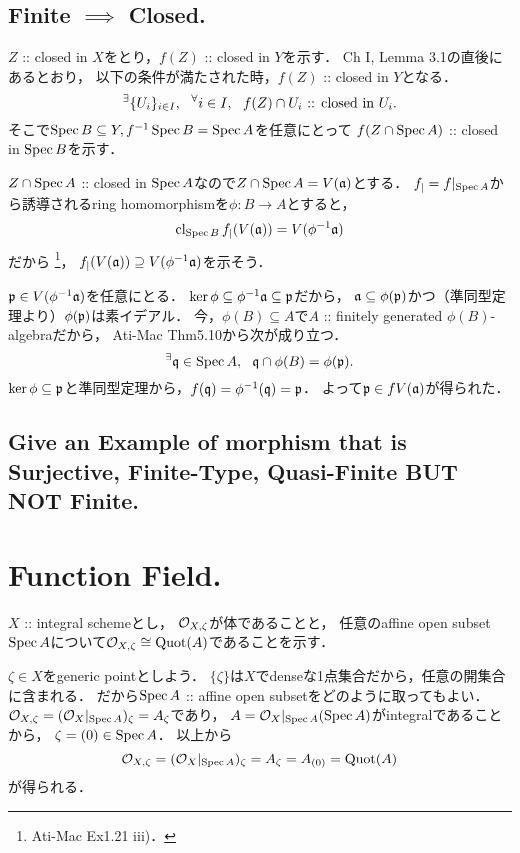 \documentclass[a4paper]{jsarticle}
\begin{document}
    \subsection{Finite $\implies$ Closed.}
    $Z$ :: closed in $X$をとり，$f(Z)$ :: closed in $Y$を示す．
    Ch I, Lemma 3.1の直後にあるとおり，
    以下の条件が満たされた時，$f(Z)$ :: closed in $Y$となる．
    \[ {}^{\exists} \{U_i\}_{i \in I},~~ {}^{\forall} i \in I,~~ f(Z) \cap U_i\text{ :: closed in }U_i. \]
    そこで$\operatorname{Spec} B \subseteq Y, f^{-1}\operatorname{Spec} B=\operatorname{Spec} A$を任意にとって
    $f(Z \cap \operatorname{Spec} A)$ :: closed in $\operatorname{Spec} B$を示す．

    $Z \cap \operatorname{Spec} A$ :: closed in $\operatorname{Spec} A$なので$Z \cap \operatorname{Spec} A=V(\mathfrak{a})$とする．
    $f_|=f|_{\operatorname{Spec} A}$から誘導されるring homomorphismを$\phi: B \to A$とすると，
    \[ \operatorname{cl}_{\operatorname{Spec} B}f_|(V(\mathfrak{a}))=V(\phi^{-1}\mathfrak{a}) \]だから
    \footnote{Ati-Mac Ex1.21 iii)．}，
    $f_|(V(\mathfrak{a})) \supseteq V(\phi^{-1}\mathfrak{a})$を示そう．
    
    $\mathfrak{p} \in V(\phi^{-1}\mathfrak{a})$を任意にとる．
    $\ker \phi \subseteq \phi^{-1}\mathfrak{a} \subseteq \mathfrak{p}$だから，
    $\mathfrak{a} \subseteq \phi(\mathfrak{p})$かつ（準同型定理より）$\phi(\mathfrak{p})$は素イデアル．
    今，$\phi(B) \subseteq A$で$A$ :: finitely generated $\phi(B)$-algebraだから，
    Ati-Mac Thm5.10から次が成り立つ．
    \[ {}^{\exists} \mathfrak{q} \in \operatorname{Spec} A,~~ \mathfrak{q} \cap \phi(B)=\phi(\mathfrak{p}). \]
    $\ker \phi \subseteq \mathfrak{p}$と準同型定理から，$f(\mathfrak{q})=\phi^{-1}(\mathfrak{q})=\mathfrak{p}$．
    よって$\mathfrak{p} \in fV(\mathfrak{a})$が得られた．

    \subsection{Give an Example of morphism that is Surjective, Finite-Type, Quasi-Finite BUT NOT Finite.}

\section{Function Field.} %
    $X$ :: integral schemeとし，
    $\mathcal{O}_{X, \zeta}$が体であることと，
    任意のaffine open subset $\operatorname{Spec} A$について$\mathcal{O}_{X, \zeta} \cong \operatorname{Quot}(A)$であることを示す．

    $\zeta \in X$をgeneric pointとしよう．
    $\{\zeta\}$は$X$でdenseな1点集合だから，任意の開集合に含まれる．
    だから$\operatorname{Spec} A$ :: affine open subsetをどのように取ってもよい．
    $\mathcal{O}_{X,\zeta}=(\mathcal{O}_X|_{\operatorname{Spec} A})_{\zeta}=A_{\zeta}$であり，
    $A=\mathcal{O}_X|_{\operatorname{Spec} A}(\operatorname{Spec} A)$がintegralであることから，
    $\zeta=(0) \in \operatorname{Spec} A$．
    以上から
    \[ \mathcal{O}_{X,\zeta}=(\mathcal{O}_X|_{\operatorname{Spec} A})_{\zeta}=A_{\zeta}=A_{(0)}=\operatorname{Quot}(A) \]
    が得られる．
\end{document}
